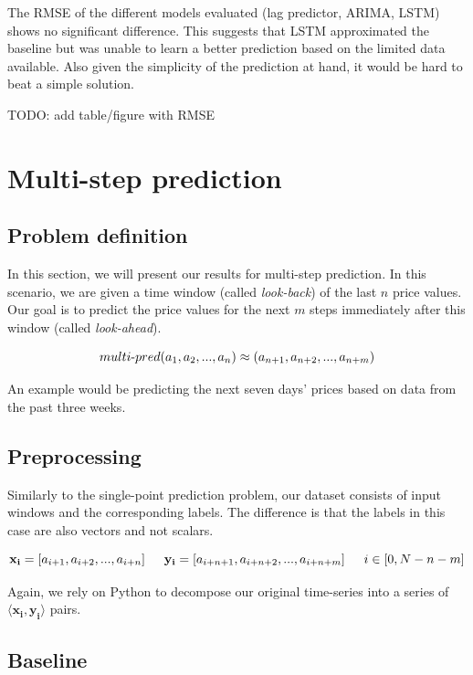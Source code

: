\documentclass{article}
\begin{document}
The RMSE of the different models evaluated (lag predictor, ARIMA, LSTM) shows no significant difference. This suggests that LSTM approximated the baseline but was unable to learn a better prediction based on the limited data available. Also given the simplicity of the prediction at hand, it would be hard to beat a simple solution.

TODO: add table/figure with RMSE

\section{Multi-step prediction}
\label{sec:multi}

\subsection{Problem definition}

In this section, we will present our results for multi-step prediction. In this scenario, we are given a time window (called \emph{look-back}) of the last $n$ price values. Our goal is to predict the price values for the next $m$ steps immediately after this window (called \emph{look-ahead}).

$$multi\textnormal{-}pred(a_1, a_2, ..., a_n) \approx (a_{n+1}, a_{n+2}, ..., a_{n+m})$$

An example would be predicting the next seven days' prices based on data from the past three weeks.

\subsection{Preprocessing}

Similarly to the single-point prediction problem, our dataset consists of input windows and the corresponding labels. The difference is that the labels in this case are also vectors and not scalars.

$$\mathbf{x_i} = [a_{i+1}, a_{i+2}, ..., a_{i+n}] \hspace{1.5em} \mathbf{y_i} = [a_{i+n+1}, a_{i+n+2}, ..., a_{i+n+m}] \hspace{1.5em} i \in [0,N-n-m]$$

Again, we rely on Python to decompose our original time-series into a series of $\langle\mathbf{x_i}, \mathbf{y_i}\rangle$ pairs.

\subsection{Baseline}
\label{sec:multi-baseline}
\end{document}

